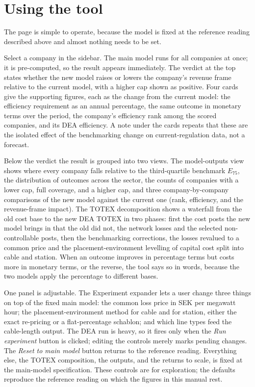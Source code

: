 \section{Using the tool}
\label{sec:tool}

The page is simple to operate, because the model is fixed at the reference reading described above
and almost nothing needs to be set.

Select a company in the sidebar. The main model runs for all companies at once; it is pre-computed,
so the result appears immediately. The verdict at the top states whether the new model raises or
lowers the company's revenue frame relative to the current model, with a higher cap shown as
positive. Four cards give the supporting figures, each as the change from the current model: the
efficiency requirement as an annual percentage, the same outcome in monetary terms over the period, the
company's efficiency rank among the scored companies, and its DEA efficiency. A note under the
cards repeats that these are the isolated effect of the benchmarking change on current-regulation
data, not a forecast.

Below the verdict the result is grouped into two views. The model-outputs view shows where
every company falls relative to the third-quartile benchmark $E_{75}$, the distribution of outcomes
across the sector, the counts of companies with a lower cap, full coverage, and a higher cap, and
three company-by-company comparisons of the new model against the current one (rank, efficiency, and
the revenue-frame impact). The TOTEX decomposition shows a waterfall from the old cost base to the new DEA
TOTEX in two phases: first the cost posts the new model brings in that the old did not, the network
losses and the selected non-controllable posts, then the benchmarking corrections, the losses
revalued to a common price and the placement-environment levelling of capital cost split into cable
and station. When an outcome improves in percentage terms but costs more in monetary terms, or the reverse,
the tool says so in words, because the two models apply the percentage to different bases.

One panel is adjustable. The Experiment expander lets a user change three things on top of the
fixed main model: the common loss price in SEK per megawatt hour; the placement-environment
method for cable and for station, either the exact re-pricing or a flat-percentage schablon; and
which line types feed the cable-length output. The DEA run is heavy, so it fires only when the
\emph{Run experiment} button is clicked; editing the controls merely marks pending changes. The
\emph{Reset to main model} button returns to the reference reading. Everything else, the TOTEX
composition, the outputs, and the returns to scale, is fixed at the main-model specification. These
controls are for exploration; the defaults reproduce the reference reading on which the figures in
this manual rest.

